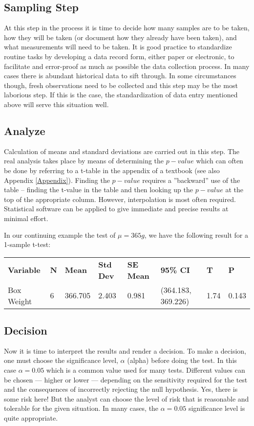 \subsection{Sampling Step}
At this step in the process it is time to decide how many samples are to be taken, how they will be taken (or document how they already have been taken), and what measurements will need to be taken.  It is good practice to standardize routine tasks by developing a data record form, either paper or electronic, to facilitate and error-proof as much as possible the data collection process.  In many cases there is abundant historical data to sift through.  In some circumstances though, fresh observations need to be collected and this step may be the most laborious step.  If this is the case, the standardization of data entry mentioned above will serve this situation well.


\subsection{Analyze}
Calculation of means and standard deviations are carried out in this step.  The real analysis takes place by means of determining the $p-value$ which can often be done by referring to a t-table in the appendix of a textbook (see also Appendix \ref{Appendix}). Finding the $p-value$ requires a ''backward'' use of the table -- finding the t-value in the table and then looking up the $p-value$ at the top of the appropriate column.  However, interpolation is most often required. Statistical software can be applied to give immediate and precise results at minimal effort.

In our continuing example the test of $ \mu = 365 g $, we have the following result for a 1-sample t-test:\\


\begin{center}
\begin{tabular}{llllllll}
\textbf{Variable} & \textbf{N} & \textbf{Mean} & \textbf{Std Dev} & \textbf{SE Mean} & \textbf{95\% CI} & \textbf{T} & \textbf{P} \\ \index{mean}
Box Weight & 6 & 366.705 & 2.403 & 0.981 & (364.183, 369.226) & 1.74 & 0.143 \\ 
\end{tabular} 
\end{center}


\subsection{Decision}
Now it is time to interpret the results and render a decision.  To make a decision, one must choose the significance level, $\alpha$ (alpha) before doing the test.  In this case $\alpha = 0.05$ which is a common value used for many tests.  Different values can be chosen --- higher or lower --- depending on the sensitivity required for the test and the consequences of incorrectly rejecting the null hypothesis.  Yes, there is some risk here!  But the analyst can choose the level of risk that is reasonable and tolerable for the given situation.  In many cases, the $\alpha = 0.05$ significance level is quite appropriate.

